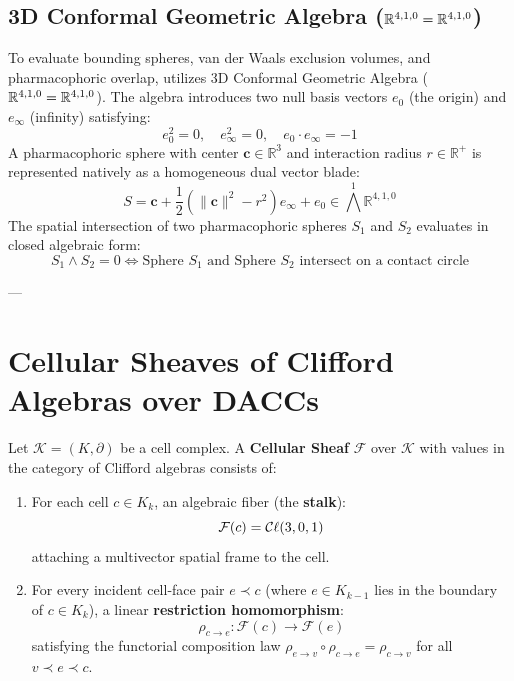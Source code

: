 \subsection{3D Conformal Geometric Algebra ($\mathbb{R}^{4,1,0} = \mathbb{R}^{4,1,0}$)}
To evaluate bounding spheres, van der Waals exclusion volumes, and pharmacophoric overlap, \ToposLang{} utilizes 3D Conformal Geometric Algebra ($\mathbb{R}^{4,1,0} = \mathbb{R}^{4,1,0}$). The algebra introduces two null basis vectors $e_0$ (the origin) and $e_\infty$ (infinity) satisfying:
\begin{equation}
    e_0^2 = 0, \quad e_\infty^2 = 0, \quad e_0 \cdot e_\infty = -1
\end{equation}
A pharmacophoric sphere with center $\mathbf{c} \in \mathbb{R}^3$ and interaction radius $r \in \mathbb{R}^+$ is represented natively as a homogeneous dual vector blade:
\begin{equation}
    S = \mathbf{c} + \frac{1}{2}(\|\mathbf{c}\|^2 - r^2) e_\infty + e_0 \in \bigwedge^1 \mathbb{R}^{4,1,0}
\end{equation}
The spatial intersection of two pharmacophoric spheres $S_1$ and $S_2$ evaluates in closed algebraic form:
\begin{equation}
    S_1 \wedge S_2 = 0 \iff \text{Sphere } S_1 \text{ and Sphere } S_2 \text{ intersect on a contact circle}
\end{equation}

---

\section{Cellular Sheaves of Clifford Algebras over DACCs}
\label{sec:cellular_sheaves_foundations}

\begin{definition}
Let $\mathcal{K} = (K, \partial)$ be a cell complex. A \textbf{Cellular Sheaf} $\mathcal{F}$ over $\mathcal{K}$ with values in the category of Clifford algebras consists of:
\begin{enumerate}
    \item For each cell $c \in K_k$, an algebraic fiber (the \textbf{stalk}):
    \begin{equation}
        \mathcal{F}(c) = \mathcal{C}\ell(3,0,1)
    \end{equation}
    attaching a multivector spatial frame to the cell.
    \item For every incident cell-face pair $e \prec c$ (where $e \in K_{k-1}$ lies in the boundary of $c \in K_k$), a linear \textbf{restriction homomorphism}:
    \begin{equation}
        \rho_{c \to e} : \mathcal{F}(c) \longrightarrow \mathcal{F}(e)
    \end{equation}
    satisfying the functorial composition law $\rho_{e \to v} \circ \rho_{c \to e} = \rho_{c \to v}$ for all $v \prec e \prec c$.
\end{enumerate}
\end{definition}

